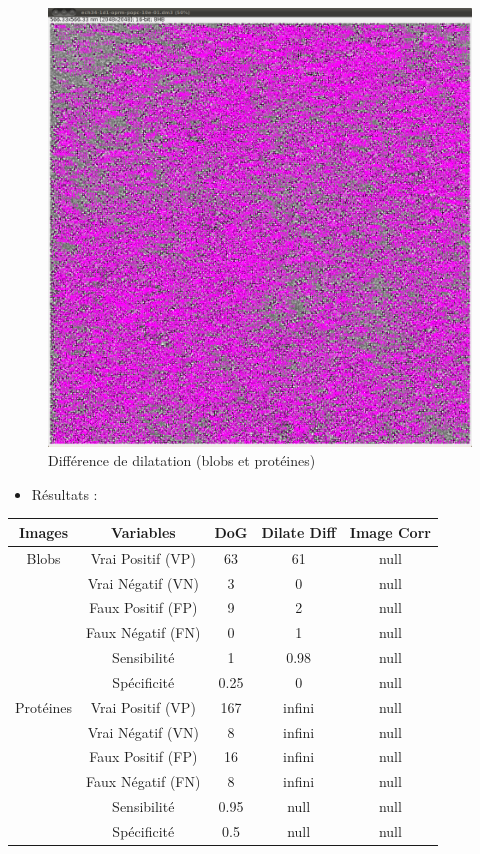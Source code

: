 \begin{figure}[!ht]
\begin{center}
\begin{minipage}{.450\linewidth}
  \includegraphics[width=1\textwidth]{protDilate.png}   
 \end{minipage} \hfill
\caption{Différence de dilatation (blobs et protéines)}
\end{center}
\end{figure}
\pagebreak

\begin{itemize}{•}
\item Résultats :
\end{itemize}

\begin{center}
\begin{tabular}{|c|c|c|c|c|}
\hline
\textbf{Images} & \textbf{Variables} & \textbf{DoG} & \textbf{Dilate Diff} & \textbf{Image Corr} \\
\hline
Blobs & Vrai Positif (VP) & 63 & 61 & null \\
	& Vrai Négatif (VN) & 3 & 0 & null \\
	& Faux Positif (FP) & 9 & 2 & null \\
	& Faux Négatif (FN) & 0 & 1 & null \\
	& Sensibilité & 1 & 0.98 & null \\
	& Spécificité & 0.25 & 0 & null \\
\hline
Protéines & Vrai Positif (VP) & 167 & infini & null \\
	& Vrai Négatif (VN) & 8 & infini & null \\
	& Faux Positif (FP) & 16 & infini & null \\
	& Faux Négatif (FN) & 8 & infini & null \\
	& Sensibilité & 0.95 & null & null \\
	& Spécificité & 0.5 & null & null \\
	\hline
\end{tabular}
\end{center}


